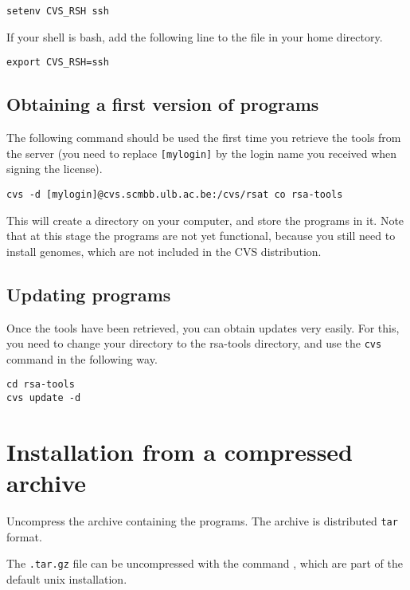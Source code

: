 \documentclass{book}
\begin{document}
\begin{verbatim}
setenv CVS_RSH ssh
\end{verbatim}

If your shell is bash, add the following line to the 
file in your home directory.

\begin{verbatim}
export CVS_RSH=ssh
\end{verbatim}


\subsection{Obtaining a first version of \RSAT programs}

The following command should be used the first time you retrieve the
tools from the server (you need to replace \texttt{[mylogin]} by the
login name you received when signing the \RSAT license).

\begin{verbatim}
cvs -d [mylogin]@cvs.scmbb.ulb.ac.be:/cvs/rsat co rsa-tools
\end{verbatim}

This will create a directory  on your computer, and
store the programs in it. Note that at this stage the programs are not
yet functional, because you still need to install genomes, which are
not included in the CVS distribution.

\subsection{Updating \RSAT programs}

Once the tools have been retrieved, you can obtain updates very
easily. For this, you need to change your directory to the rsa-tools
directory, and use the \texttt{cvs} command in the following way.

\begin{verbatim}
cd rsa-tools
cvs update -d
\end{verbatim}


\section{Installation from a compressed archive}

Uncompress the archive containing the programs. The archive is
distributed \texttt{tar} format.

The \texttt{.tar.gz} file can be uncompressed with the command
, which are part of the default unix installation.
\end{document}
